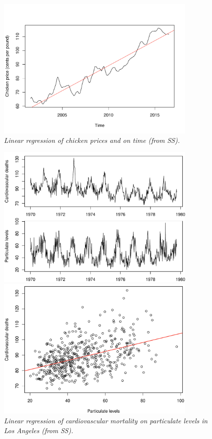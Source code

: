 \documentclass{article}
\begin{document}
\begin{figure}[tb]
\centering
\includegraphics[width=0.875\textwidth]{fig/chicken-1.pdf}
\caption{\it Linear regression of chicken prices and on time (from SS).} 
\label{fig:chicken}
\end{figure}

\begin{figure}[p]
\centering
\includegraphics[width=0.875\textwidth]{fig/cardio-1.pdf} 

\bigskip\bigskip
\includegraphics[width=0.875\textwidth]{fig/cardio-2.pdf}
\caption{\it Linear regression of cardiovascular mortality on particulate levels 
  in Los Angeles (from SS).} 
\label{fig:cardio}
\end{figure}
\end{document}
